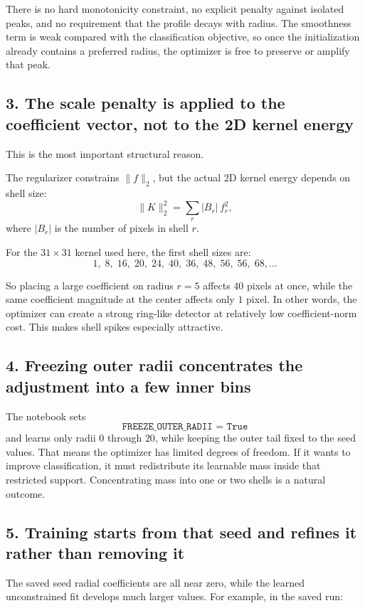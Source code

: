 \documentclass{article}
\begin{document}
There is no hard monotonicity constraint, no explicit penalty against isolated peaks, and no requirement that the profile decays with radius. The smoothness term is weak compared with the classification objective, so once the initialization already contains a preferred radius, the optimizer is free to preserve or amplify that peak.

\subsection*{3. The scale penalty is applied to the coefficient vector, not to the 2D kernel energy}
This is the most important structural reason.

The regularizer constrains \(\lVert f\rVert_2\), but the actual 2D kernel energy depends on shell size:
\[
\lVert K\rVert_2^2
=
\sum_r |B_r|\, f_r^2,
\]
where \(|B_r|\) is the number of pixels in shell \(r\).

For the \(31\times31\) kernel used here, the first shell sizes are:
\[
1,\;8,\;16,\;20,\;24,\;40,\;36,\;48,\;56,\;56,\;68,\ldots
\]

So placing a large coefficient on radius \(r=5\) affects \(40\) pixels at once, while the same coefficient magnitude at the center affects only \(1\) pixel. In other words, the optimizer can create a strong ring-like detector at relatively low coefficient-norm cost. This makes shell spikes especially attractive.

\subsection*{4. Freezing outer radii concentrates the adjustment into a few inner bins}
The notebook sets
\[
\texttt{FREEZE\_OUTER\_RADII = True}
\]
and learns only radii \(0\) through \(20\), while keeping the outer tail fixed to the seed values. That means the optimizer has limited degrees of freedom. If it wants to improve classification, it must redistribute its learnable mass inside that restricted support. Concentrating mass into one or two shells is a natural outcome.

\subsection*{5. Training starts from that seed and refines it rather than removing it}
The saved seed radial coefficients are all near zero, while the learned unconstrained fit develops much larger values. For example, in the saved run:
\end{document}
